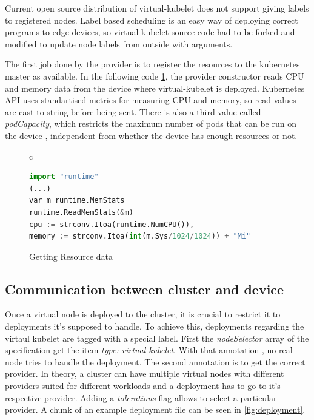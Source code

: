 Current open source distribution of virtual-kubelet does not support giving labels to registered nodes. Label based scheduling is an easy way of deploying correct programs to edge devices, so virtual-kubelet source code had to be forked and modified to update node labels from outside with arguments.

The first job done by the provider is to register the resources to the kubernetes master as available. In the following code \ref{fig:runtime}, the provider constructor reads CPU and memory data from the device where virtual-kubelet is deployed. Kubernetes API uses standartised metrics for measuring CPU and memory, so read values are cast to string before being sent. There is also a third value called \textit{podCapacity}, which restricts the maximum number of pods that can be run on the device , independent from whether the device has enough resources or not.
\begin{figure}[htpb]
  \centering
  \begin{tabular}{c}
  \begin{lstlisting}[language=python]
import "runtime"
(...)
var m runtime.MemStats
runtime.ReadMemStats(&m)
cpu := strconv.Itoa(runtime.NumCPU()),
memory := strconv.Itoa(int(m.Sys/1024/1024)) + "Mi"

\end{lstlisting}
\end{tabular}
\caption{Getting Resource data}\label{fig:runtime}
\end{figure}

\subsection{Communication between cluster and device}
Once a virtual node is deployed to the cluster, it is crucial to restrict it to deployments it's supposed to handle. To achieve this, deployments regarding the virtaul kubelet are tagged with a special label. First the \textit{nodeSelector} array of the specification get the item \textit{type: virtual-kubelet}. With that annotation , no real node tries to handle the deployment. The second annotation is to get the correct provider. In theory, a cluster can have multiple virtual nodes with different providers suited for different workloads and a deployment has to go to it's respective provider. Adding a \textit{tolerations} flag allows to select a particular provider. A chunk of an example deployment file can be seen in \ref{fig:deployment}.

